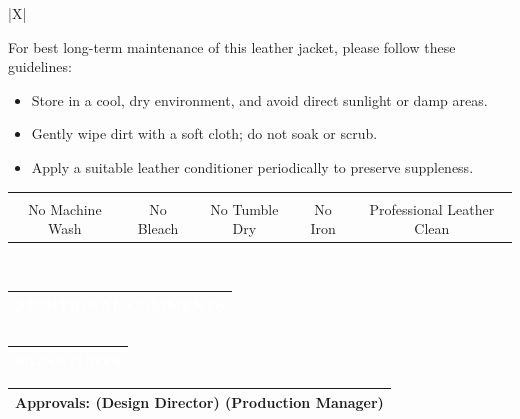 \documentclass[landscape]{article}
\newcommand{\techsection}[1]{%
\noindent\begin{tabularx}{\textwidth}{|X|}
\hline
\cellcolor{primaryblue}\textcolor{white}{\large\textbf{\faIcon{angle-right} #1}} \\
\hline
\end{tabularx}
\vspace{0.1cm}
}
\begin{document}
\noindent\begin{tabularx}{\textwidth}{|X|}
\hline
\begin{minipage}[t]{\linewidth}
\vspace{0.3cm}
\large For best long-term maintenance of this leather jacket, please follow these guidelines:
\begin{itemize}
\item Store in a cool, dry environment, and avoid direct sunlight or damp areas.
\item Gently wipe dirt with a soft cloth; do not soak or scrub.
\item Apply a suitable leather conditioner periodically to preserve suppleness.
\end{itemize}

\begin{center}
\begin{tabular}{ccccc}
\textcolor{primaryblue}{\Large\faIcon{ban}} &
\textcolor{primaryblue}{\Large\faIcon{ban}} &
\textcolor{primaryblue}{\Large\faIcon{ban}} &
\textcolor{primaryblue}{\Large\faIcon{ban}} &
\textcolor{primaryblue}{\Large\faIcon{check-circle}} \\
No Machine Wash & No Bleach & No Tumble Dry & No Iron & Professional Leather Clean \\
\end{tabular}
\end{center}

\vspace{0.3cm}
\end{minipage} \\
\hline
\end{tabularx}

\vspace{0.7cm}

\techsection{ADDITIONAL COMMENTS}
\vspace{-0.3cm}
\noindent\begin{tabularx}{\textwidth}{|X|}
\hline
\begin{minipage}[t]{\linewidth}
\vspace{0.3cm}
\large 
\vspace{0.3cm}
\end{minipage} \\
\hline
\end{tabularx}

\vspace{0.7cm}
\techsection{SIGNATURES}
\vspace{-0.3cm}
\noindent\begin{tabularx}{\textwidth}{|X|}
\hline
\begin{minipage}[t]{\linewidth}
\vspace{0.3cm}
\large\textbf{Approvals:} \underline{\hspace{5cm}} (Design Director) \hspace{1cm} \underline{\hspace{5cm}} (Production Manager)
\vspace{0.3cm}
\end{minipage} \\
\hline
\end{tabularx}
\end{document}
